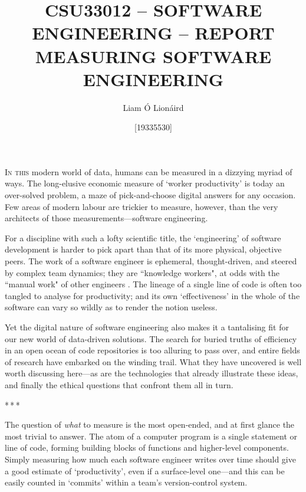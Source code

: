 \documentclass[12pt]{article}
\newcommand{\parbreak}{\bigskip\par\centerline{*\,*\,*}\medskip\par}
\begin{document}
	\title{{\large CSU33012 -- SOFTWARE ENGINEERING -- REPORT}\\\bigskip \textbf{MEASURING SOFTWARE ENGINEERING}}
	\author{Liam \'{O} Lion\'{a}ird \and [19335530]}
	\maketitle
	
	\begin{center}
		\hrulefill
	\end{center}

	\lettrine{I}{n this} modern world of data, humans can be measured in a dizzying myriad of ways. The long-elusive economic measure of `worker productivity' is today an over-solved problem, a maze of pick-and-choose digital answers for any occasion. Few areas of modern labour are trickier to measure, however, than the very architects of those measurements---software engineering.
	
	For a discipline with such a lofty scientific title, the `engineering' of software development is harder to pick apart than that of its more physical, objective peers. The work of a software engineer is ephemeral, thought-driven, and steered by complex team dynamics; they are ``knowledge workers", at odds with the ``manual work" of other engineers \cite{drucker}. The lineage of a single line of code is often too tangled to analyse for productivity; and its own `effectiveness' in the whole of the software can vary so wildly as to render the notion useless.
	
	Yet the digital nature of software engineering also makes it a tantalising fit for our new world of data-driven solutions. The search for buried truths of efficiency in an open ocean of code repositories is too alluring to pass over, and entire fields of research have embarked on the winding trail. What they have uncovered is well worth discussing here---as are the technologies that already illustrate these ideas, and finally the ethical questions that confront them all in turn.
	
	\parbreak
	
	The question of \textit{what} to measure is the most open-ended, and at first glance the most trivial to answer. The atom of a computer program is a single statement or line of code, forming building blocks of functions and higher-level components. Simply measuring how much each software engineer writes over time should give a good estimate of `productivity', even if a surface-level one---and this can be easily counted in `commits' within a team's version-control system.
	
\end{document}
